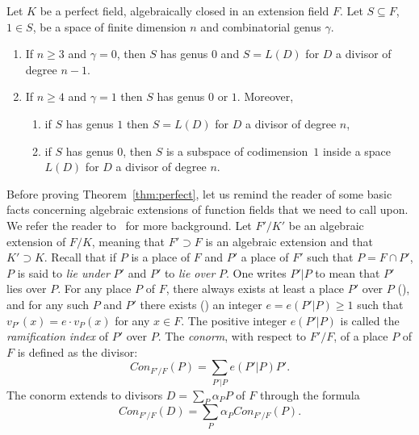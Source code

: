 \documentclass[ALCO,Unicode,ThmDefs]{cedram}
\renewcommand{\geq}{\geqslant}
\begin{document}
\begin{theo}\label{thm:perfect}
Let $K$ be a perfect field, algebraically closed in an extension field $F$. Let $S \subseteq F$, $1\in S$, be a space of finite dimension $n$ and combinatorial genus $\gamma$.
\begin{enumerate}
\item \label{9.1} If $n\geq3$ and $\gamma=0$, then $S$ has genus $0$ and $S=L(D)$ for $D$ a divisor of degree $n-1$.
\item \label{9.2} If $n\geq4$ and $\gamma=1$ then $S$ has genus $0$ or $1$. Moreover,
\begin{enumerate}
\item if $S$ has genus $1$ then $S=L(D)$ for $D$ a divisor of degree $n$,
\item if $S$ has genus $0$, then $S$ is a subspace of codimension~$1$ inside a space $L(D)$ for $D$ a divisor of degree $n$.
\end{enumerate}
\end{enumerate}
\end{theo}

Before proving Theorem~\ref{thm:perfect}, let us remind the reader of some basic facts concerning algebraic extensions of function fields that we need to call upon. We refer the reader to~\cite[Chapter~III]{Stichtenoth} for more background. Let $F'/K'$ be an algebraic extension of $F/K$, meaning that $F'\supset F$ is an algebraic extension and that $K'\supset K$. Recall that if $P$ is a place of $F$ and $P'$ a place of $F'$ such that $P=F\cap P'$, $P$ is said to \emph{lie under} $P'$ and $P'$ to \emph{lie over} $P$. One writes $P'|P$ to mean that $P'$ lies over $P$. For any place $P$ of $F$, there always exists at least a place $P'$ over $P$ (\cite[Proposition~III.1.7]{Stichtenoth}), and for any such $P$ and $P'$ there exists (\cite[Proposition~III.1.4]{Stichtenoth}) an integer $e=e(P'|P)\geq1$ such that $v_{P'}(x)=e\cdot v_P(x)$ for any $x\in F$. The positive integer $e(P'|P)$ is called the \emph{ramification index} of $P'$ over $P$. The \emph{conorm}, with respect to $F'/F$, of a place $P$ of $F$ is defined as the divisor:
\[
Con_{F'/F}(P)=\sum_{P'|P}e(P'|P)P'.
\]
The conorm extends to divisors $D=\sum_P\alpha_PP$ of $F$ through the formula
\[
Con_{F'/F}(D)=\sum_P\alpha_P Con_{F'/F}(P).
\]
\end{document}
